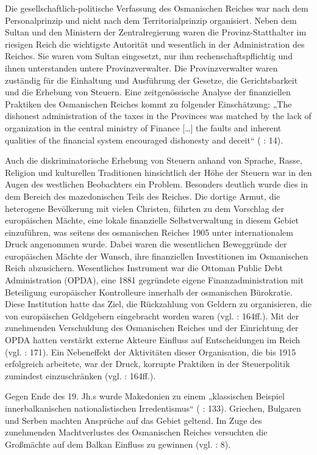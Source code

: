 Die gesellschaftlich-politische Verfassung des Osmanischen Reiches war nach dem Personalprinzip und nicht nach dem Territorialprinzip organisiert. Neben dem Sultan und den Ministern der Zentralregierung waren die Provinz-Statthalter im riesigen Reich die wichtigste Autorität und wesentlich in der Administration des Reiches. Sie waren vom Sultan eingesetzt, nur ihm rechenschaftspflichtig und ihnen unterstanden untere Provinzverwalter. Die Provinzverwalter waren zuständig für die Einhaltung und Ausführung der Gesetze, die Gerichtsbarkeit und die Erhebung von Steuern. Eine zeitgenössische Analyse der finanziellen Praktiken des Osmanischen Reiches kommt zu folgender Einschätzung: „The dishonest administration of the taxes in the Provinces was matched by the lack of organization in the central ministry of Finance […] the faults and inherent qualities of the financial system encouraged dishonesty and deceit“ (\cite{blaisd} : 14).\par
Auch die diskriminatorische Erhebung von Steuern anhand von Sprache, Rasse, Religion und kulturellen Traditionen hinsichtlich der Höhe der Steuern war in den Augen des westlichen Beobachters ein Problem. Besonders deutlich wurde dies in dem Bereich des mazedonischen Teils des Reiches. Die dortige Armut, die heterogene Bevölkerung mit vielen Christen, führten zu dem Vorschlag der europäischen Mächte, eine lokale finanzielle Selbstverwaltung in diesem Gebiet einzuführen, was seitens des osmanischen Reiches 1905 unter internationalem Druck angenommen wurde. Dabei waren die wesentlichen Beweggründe der europäischen Mächte der Wunsch, ihre finanziellen Investitionen im Osmanischen Reich abzusichern. Wesentliches Instrument war die Ottoman Public Debt Administration (OPDA), eine 1881 gegründete eigene Finanzadministration mit Beteiligung europäischer Kontrolleure innerhalb der osmanischen Bürokratie. Diese Institution hatte das Ziel, die Rückzahlung von Geldern zu organisieren, die von europäischen Geldgebern eingebracht worden waren (vgl. \cite{blaisd} : 164ff.). Mit der zunehmenden Verschuldung des Osmanischen Reiches und der Einrichtung der OPDA hatten verstärkt externe Akteure Einfluss auf Entscheidungen im Reich (vgl. \cite{toepfer} : 171). Ein Nebeneffekt der Aktivitäten dieser Organisation, die bis 1915 erfolgreich arbeitete, war der Druck, korrupte Praktiken in der Steuerpolitik zumindest einzuschränken (vgl. \cite{blaisd} : 164ff.).\par
Gegen Ende des 19. Jh.s wurde Makedonien zu einem „klassischen Beispiel innerbalkanischen nationalistischen Irredentismus“ (\cite{tzermisa} : 133). Griechen, Bulgaren und Serben machten Ansprüche auf das Gebiet geltend. Im Zuge des zunehmenden Machtverlustes des Osmanischen Reiches versuchten die Großmächte auf dem Balkan Einfluss zu gewinnen (vgl. \cite{bark01} : 8).
